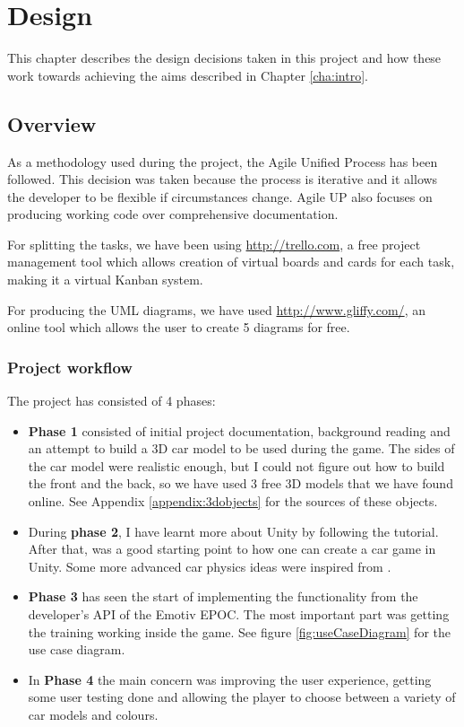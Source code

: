 \chapter{Design}
\label{cha:design}

This chapter describes the design decisions taken in this project and how these work towards achieving the aims described in Chapter \ref{cha:intro}.

\section{Overview}
As a methodology used during the project, the Agile Unified Process has been followed. This decision was taken because the process is iterative and it allows the developer to be flexible if circumstances change. Agile UP also focuses on producing working code over comprehensive documentation.

For splitting the tasks, we have been using \url{http://trello.com}, a free project management tool which allows creation of virtual boards and cards for each task, making it a virtual Kanban system.

For producing the UML diagrams, we have used \url{http://www.gliffy.com/}, an online tool which allows the user to create 5 diagrams for free.

\subsection{Project workflow}
The project has consisted of 4 phases:
\begin{itemize}
	\item \textbf{Phase 1} consisted of initial project documentation, background reading and an attempt to build a 3D car model to be used during the game. The sides of the car model were realistic enough, but I could not figure out how to build the front and the back, so we have used 3 free 3D models that we have found online. See Appendix \ref{appendix:3dobjects} for the sources of these objects.
	\item During \textbf{phase 2}, I have learnt more about Unity by following the \cite{walkerboys} tutorial. After that, \cite{flattutorials} was a good starting point to how one can create a car game in Unity. Some more advanced car physics ideas were inspired from \cite{carphysics}.
	\item \textbf{Phase 3} has seen the start of implementing the functionality from the developer's API of the Emotiv EPOC. The most important part was getting the training working inside the game. See figure \ref{fig:useCaseDiagram} for the use case diagram.
	\item In \textbf{Phase 4} the main concern was improving the user experience, getting some user testing done and allowing the player to choose between a variety of car models and colours.
\end{itemize}

